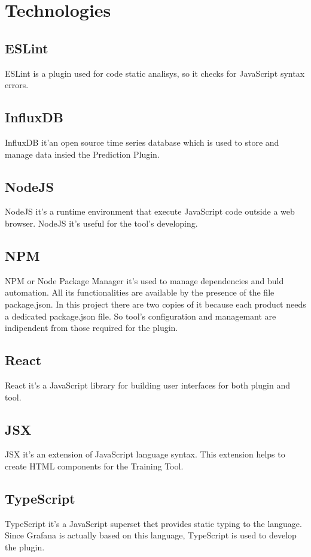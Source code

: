 \section{Technologies}
\subsection{ESLint}
ESLint is a plugin used for code static analisys, so it checks for JavaScript syntax errors.

\subsection{InfluxDB}
InfluxDB it'an open source time series database which is used to store and manage data insied the Prediction Plugin. 

\subsection{NodeJS}
NodeJS it's a runtime environment that execute JavaScript code outside a web browser. NodeJS it's useful for the tool's developing.

\subsection{NPM}
NPM or Node Package Manager it's used to manage dependencies and buld automation. All its functionalities are available by the presence of the file package.json. In this project there are two copies of it because each product needs a dedicated package.json file. So tool's configuration and managemant are indipendent from those required for the plugin.

\subsection{React}
React it's a JavaScript library for building user interfaces for both plugin and tool.

\subsection{JSX}
JSX it's an extension of JavaScript language syntax. This extension helps to create HTML components for the Training Tool.

\subsection{TypeScript}
TypeScript it's a JavaScript superset thet provides static typing to the language. Since Grafana  is actually based on this language, TypeScript is used to develop the plugin.

